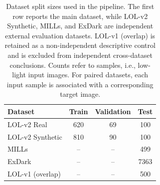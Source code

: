 \begin{table}[t]
	\centering
	\caption{Dataset split sizes used in the pipeline. The first row reports the main dataset, while LOL-v2 Synthetic, MILLs, and ExDark are independent external evaluation datasets. LOL-v1 (overlap) is retained as a non-independent descriptive control and is excluded from independent cross-dataset conclusions. Counts refer to samples, i.e., low-light input images. For paired datasets, each input sample is associated with a corresponding target image.}
	\label{tab:dataset_splits}
	\begin{tabular}{lccc}
		\toprule
		Dataset & Train & Validation & Test \\
		\midrule
		LOL-v2 Real & 620 & 69 & 100 \\
		\midrule
		LOL-v2 Synthetic & 810 & 90 & 100 \\
		MILLs & -- & -- & 499 \\
		ExDark & -- & -- & 7363 \\
		\midrule
		LOL-v1 (overlap) & -- & -- & 500 \\
		\bottomrule
	\end{tabular}
\end{table}